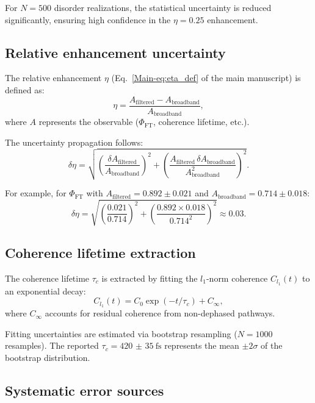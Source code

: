 \documentclass[11pt,a4paper]{article}
\begin{document}
For $N = 500$ disorder realizations, the statistical uncertainty is reduced significantly, ensuring high confidence in the $\eta = 0.25$ enhancement.

\subsection{Relative enhancement uncertainty}

The relative enhancement $\eta$ (Eq.~\cref{Main-eq:eta_def} of the main manuscript) is defined as:
\begin{equation}
\eta = \frac{A_{\mathrm{filtered}} - A_{\mathrm{broadband}}}{A_{\mathrm{broadband}}},
\end{equation}
where $A$ represents the observable ($\Phi_{\mathrm{FT}}$, coherence lifetime, etc.).

The uncertainty propagation follows:
\begin{equation}
\delta\eta = \sqrt{\left(\frac{\delta A_{\mathrm{filtered}}}{A_{\mathrm{broadband}}}\right)^2 + \left(\frac{A_{\mathrm{filtered}} \, \delta A_{\mathrm{broadband}}}{A_{\mathrm{broadband}}^2}\right)^2}.
\label{eq:error_propagation}
\end{equation}

For example, for $\Phi_{\mathrm{FT}}$ with $A_{\mathrm{filtered}} = 0.892 \pm 0.021$ and $A_{\mathrm{broadband}} = 0.714 \pm 0.018$:
\begin{equation}
\delta\eta = \sqrt{\left(\frac{0.021}{0.714}\right)^2 + \left(\frac{0.892 \times 0.018}{0.714^2}\right)^2} \approx 0.03.
\end{equation}

\subsection{Coherence lifetime extraction}

The coherence lifetime $\tau_c$ is extracted by fitting the $l_1$-norm coherence $C_{l_1}(t)$ to an exponential decay:
\begin{equation}
C_{l_1}(t) = C_0 \exp(-t/\tau_c) + C_{\infty},
\label{eq:coherence_fit}
\end{equation}
where $C_{\infty}$ accounts for residual coherence from non-dephased pathways.

Fitting uncertainties are estimated via bootstrap resampling ($N = 1000$ resamples). The reported $\tau_c = \SI{420(35)}{\femto\second}$ represents the mean $\pm 2\sigma$ of the bootstrap distribution.

\subsection{Systematic error sources}
\end{document}
